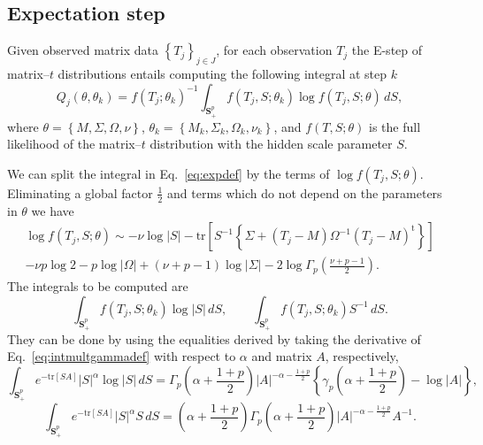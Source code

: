 \documentclass[english,listof=totoc]{scrartcl}
\begin{document}
\subsection{Expectation step}

Given observed matrix data $\left\{T_j\right\}_{j\in J}$, for each observation $T_j$ the E-step of matrix--$t$ distributions entails computing the following integral at step $k$
\begin{equation}
Q_j(\theta,\theta_k)=f(T_j;\theta_k)^{-1}\int_{\mathbf{S}_+^p}f(T_{j},S;\theta_k)\log f\left(T_{j},S;\theta\right)\,dS,\label{eq:expdef}
\end{equation}
where $\theta=\left\{M,\Sigma,\Omega,\nu\right\}$, $\theta_k=\left\{M_k,\Sigma_k,\Omega_k,\nu_k\right\}$, and $f(T,S;\theta)$ is the full likelihood of the matrix--$t$ distribution with the hidden scale parameter $S$.

We can split the integral in Eq.~\eqref{eq:expdef} by the terms of $\log f(T_{j},S;\theta)$. Eliminating a global factor $\frac{1}{2}$ and terms which do not depend on the parameters in $\theta$ we have
\begin{equation}
\begin{split}\log f(T_{j},S;\theta)\sim -\nu\log|S|-\textrm{tr}\left[S^{-1}\left\{\Sigma+(T_j-M)\Omega^{-1}(T_j-M)^{\textrm{t}}\right\}\right]\\
-\nu p\log2-p\log |\Omega|+(\nu+p-1)\log |\Sigma|-2\log\Gamma_{p}\left(\frac{\nu+p-1}{2}\right).
\end{split}\label{eq:logf}
\end{equation}
The integrals to be computed are
\begin{equation}
\int_{\mathbf{S}_+^p}f(T_j,S;\theta_k)\log |S|\,dS, \qquad 
\int_{\mathbf{S}_+^p}f(T_j,S;\theta_k) S^{-1}\,dS.
\end{equation}
They can be done by using the equalities derived by taking the derivative of Eq.~\eqref{eq:intmultgammadef} with respect to $\alpha$ and matrix $A$, respectively,
\begin{equation}
\int_{\mathbf{S}_+^p}e^{-\textrm{tr}\left[SA\right]}|S|^{\alpha}\log |S|\,dS=\Gamma_{p}\left(\alpha+\frac{1+p}{2}\right)|A|^{-\alpha-\frac{1+p}{2}}\left\{\gamma_{p}\left(\alpha+\frac{1+p}{2}\right)-\log |A|\right\},\label{eq:intderivative1}
\end{equation}
\begin{equation}
\int_{\mathbf{S}_+^p}e^{-\textrm{tr}\left[SA\right]}|S|^{\alpha}S\,dS=\left(\alpha+\frac{1+p}{2}\right)\Gamma_{p}\left(\alpha+\frac{1+p}{2}\right)|A|^{-\alpha-\frac{1+p}{2}}A^{-1}.\label{eq:intderivative2}
\end{equation}
\end{document}
